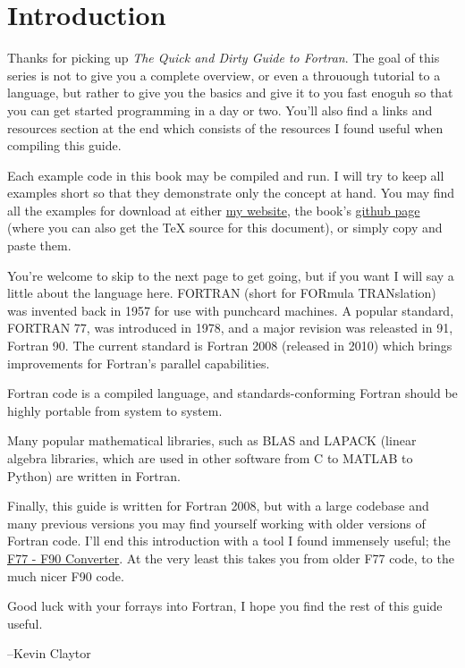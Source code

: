 \section{Introduction}

Thanks for picking up \emph{The Quick and Dirty Guide to Fortran}. 
The goal of this series is not to give you a complete overview, or even a throuough tutorial to a language,
 but rather to give you the basics and give it to you fast enoguh so that you can get started programming in a day or two. 
You'll also find a links and resources section at the end which consists of the resources I found useful when compiling this guide.

Each example code in this book may be compiled and run. I will try to keep all examples short so that they demonstrate only the concept at hand. 
You may find all the examples for download at either
 \href{http://people.duke.edu/~kec30/}{my website}, the book's
 \href{https://github.com/KEClaytor/QuickDirtyFortran}{github page} (where you can also get the TeX source for this document), or simply copy and paste them.

You're welcome to skip to the next page to get going, but if you want I will say a little about the language here.
FORTRAN (short for FORmula TRANslation) was invented back in 1957 for use with punchcard machines. 
A popular standard, FORTRAN 77, was introduced in 1978, and a major revision was releasted in 91, Fortran 90. 
The current standard is Fortran 2008 (released in 2010) which brings improvements for Fortran's parallel capabilities.

Fortran code is a compiled language, and standards-conforming Fortran should be highly portable from system to system.

Many popular mathematical libraries, such as BLAS and LAPACK (linear algebra libraries, which are used in other software from C to MATLAB to Python) are written in Fortran.

Finally, this guide is written for Fortran 2008, but with a large codebase and many previous versions you may find yourself
 working with older versions of Fortran code. 
I'll end this introduction with a tool I found immensely useful; the \href{http://www.polyhedron.com/plusfortonline.php}{F77 - F90 Converter}.
 At the very least this takes you from older F77 code, to the much nicer F90 code.

Good luck with your forrays into Fortran, I hope you find the rest of this guide useful.

    --Kevin Claytor